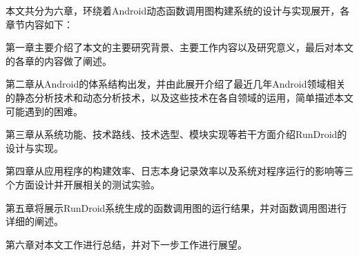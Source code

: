 本文共分为六章，环绕着Android动态函数调用图构建系统的设计与实现展开，各章节内容如下：

第一章主要介绍了本文的主要研究背景、主要工作内容以及研究意义，最后对本文的各章的内容做了阐述。

第二章从Android的体系结构出发，并由此展开介绍了最近几年Android领域相关的静态分析技术和动态分析技术，以及这些技术在各自领域的运用，简单描述本文可能遇到的困难。

第三章从系统功能、技术路线、技术选型、模块实现等若干方面介绍RunDroid的设计与实现。

第四章从应用程序的构建效率、日志本身记录效率以及系统对程序运行的影响等三个方面设计并开展相关的测试实验。

第五章将展示RunDroid系统生成的函数调用图的运行结果，并对函数调用图进行详细的阐述。

第六章对本文工作进行总结，并对下一步工作进行展望。
